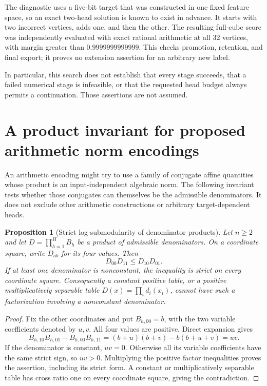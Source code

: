 \documentclass[11pt]{article}
\newtheorem{proposition}{Proposition}
\begin{document}
The diagnostic uses a five-bit target that was constructed in one fixed
feature space, so an exact two-head solution is known to exist in advance.
It starts with two incorrect vertices, adds one, and then the other.
The resulting full-cube score was independently evaluated with exact
rational arithmetic at all 32 vertices, with margin greater than
$0.9999999999999$. This checks promotion, retention, and final export;
it proves no extension assertion for an arbitrary new label.

In particular, this search does not establish that every stage succeeds,
that a failed numerical stage is infeasible, or that the requested head
budget always permits a continuation. Those assertions are not assumed.

\section{A product invariant for proposed arithmetic norm encodings}

An arithmetic encoding might try to use a family of conjugate affine
quantities whose product is an input-independent algebraic norm. The
following invariant tests whether those conjugates can themselves be
the admissible denominators. It does not exclude other arithmetic
constructions or arbitrary target-dependent heads.

\begin{proposition}[Strict log-submodularity of denominator products]
Let $n\ge2$ and let $D=\prod_{h=1}^H B_h$ be a product of admissible
denominators. On a coordinate square, write $D_{ab}$ for its four
values. Then
\[
 D_{00}D_{11}\le D_{10}D_{01}.
\]
If at least one denominator is nonconstant, the inequality is strict
on every coordinate square. Consequently a constant positive table,
or a positive multiplicatively separable table
$D(x)=\prod_i d_i(x_i)$, cannot have such a factorization involving
a nonconstant denominator.
\end{proposition}
\begin{proof}
Fix the other coordinates and put
$B_{h,00}=b$, with the two variable coefficients denoted by $u,v$.
All four values are positive. Direct expansion gives
\[
 B_{h,10}B_{h,01}-B_{h,00}B_{h,11}
 =(b+u)(b+v)-b(b+u+v)=uv.
\]
If the denominator is constant, $uv=0$. Otherwise all its variable
coefficients have the same strict sign, so $uv>0$. Multiplying the
positive factor inequalities proves the assertion, including its
strict form. A constant or multiplicatively separable table has
cross ratio one on every coordinate square, giving the contradiction.
\end{proof}
\end{document}
